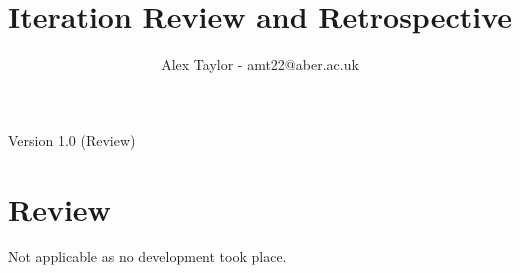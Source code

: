 \documentclass{article}
\title{Iteration Review and Retrospective}
\author{Alex Taylor - amt22@aber.ac.uk}
\begin{document}
\maketitle
\begin{center}
	Version 1.0 (Review)
\end{center}
\tableofcontents
\thispagestyle{empty}
\newpage

\section{Review}
Not applicable as no development took place.
\end{document}
